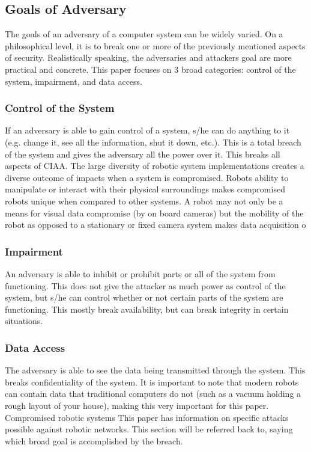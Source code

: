 \subsection{Goals of Adversary}

The goals of an adversary of a computer system can be widely varied. On a philosophical level, it is to break one or more of the previously mentioned aspects of security. Realistically speaking, the adversaries and attackers goal are more practical and concrete. This paper focuses on 3 broad categories: control of the system, impairment, and data access.
\\  %
\subsubsection{Control of the System}
If an adversary is able to gain control of a system, s/he can do anything to it (e.g. change it, see all the information, shut it down, etc.). This is a total breach of the system and gives the adversary all the power over it. This breaks all aspects of CIAA. 
The large diversity of robotic system implementations creates a diverse outcome of impacts when a system is compromised.  Robots ability to manipulate or interact with their physical surroundings makes compromised robots unique when compared to other systems.  A robot may not only be a means for visual data compromise (by on board cameras) but the mobility of the robot as opposed to a stationary or fixed camera system makes data acquisition o
\subsubsection{Impairment}
An adversary is able to inhibit or prohibit parts or all of the system from functioning. This does not give the attacker as much power as control of the system, but s/he can control whether or not certain parts of the system are functioning. This mostly break availability, but can break integrity in certain situations. 
\subsubsection{Data Access}
The adversary is able to see the data being transmitted through the system. This breaks confidentiality of the system. It is important to note that modern robots can contain data that traditional computers do not (such as a vacuum holding a rough layout of your house), making this very important for this paper.
\\
Compromised robotic systems 
This paper has information on specific attacks possible against robotic networks. This section will be referred back to, saying which broad goal is accomplished by the breach.

